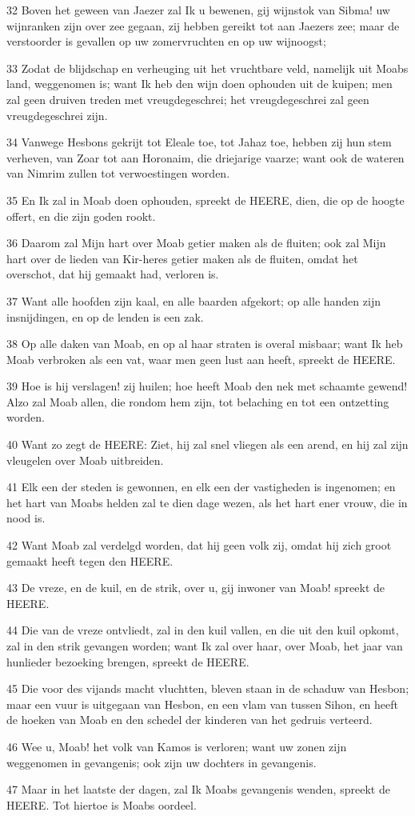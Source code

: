 \par 32 Boven het geween van Jaezer zal Ik u bewenen, gij wijnstok van Sibma! uw wijnranken zijn over zee gegaan, zij hebben gereikt tot aan Jaezers zee; maar de verstoorder is gevallen op uw zomervruchten en op uw wijnoogst;
\par 33 Zodat de blijdschap en verheuging uit het vruchtbare veld, namelijk uit Moabs land, weggenomen is; want Ik heb den wijn doen ophouden uit de kuipen; men zal geen druiven treden met vreugdegeschrei; het vreugdegeschrei zal geen vreugdegeschrei zijn.
\par 34 Vanwege Hesbons gekrijt tot Eleale toe, tot Jahaz toe, hebben zij hun stem verheven, van Zoar tot aan Horonaim, die driejarige vaarze; want ook de wateren van Nimrim zullen tot verwoestingen worden.
\par 35 En Ik zal in Moab doen ophouden, spreekt de HEERE, dien, die op de hoogte offert, en die zijn goden rookt.
\par 36 Daarom zal Mijn hart over Moab getier maken als de fluiten; ook zal Mijn hart over de lieden van Kir-heres getier maken als de fluiten, omdat het overschot, dat hij gemaakt had, verloren is.
\par 37 Want alle hoofden zijn kaal, en alle baarden afgekort; op alle handen zijn insnijdingen, en op de lenden is een zak.
\par 38 Op alle daken van Moab, en op al haar straten is overal misbaar; want Ik heb Moab verbroken als een vat, waar men geen lust aan heeft, spreekt de HEERE.
\par 39 Hoe is hij verslagen! zij huilen; hoe heeft Moab den nek met schaamte gewend! Alzo zal Moab allen, die rondom hem zijn, tot belaching en tot een ontzetting worden.
\par 40 Want zo zegt de HEERE: Ziet, hij zal snel vliegen als een arend, en hij zal zijn vleugelen over Moab uitbreiden.
\par 41 Elk een der steden is gewonnen, en elk een der vastigheden is ingenomen; en het hart van Moabs helden zal te dien dage wezen, als het hart ener vrouw, die in nood is.
\par 42 Want Moab zal verdelgd worden, dat hij geen volk zij, omdat hij zich groot gemaakt heeft tegen den HEERE.
\par 43 De vreze, en de kuil, en de strik, over u, gij inwoner van Moab! spreekt de HEERE.
\par 44 Die van de vreze ontvliedt, zal in den kuil vallen, en die uit den kuil opkomt, zal in den strik gevangen worden; want Ik zal over haar, over Moab, het jaar van hunlieder bezoeking brengen, spreekt de HEERE.
\par 45 Die voor des vijands macht vluchtten, bleven staan in de schaduw van Hesbon; maar een vuur is uitgegaan van Hesbon, en een vlam van tussen Sihon, en heeft de hoeken van Moab en den schedel der kinderen van het gedruis verteerd.
\par 46 Wee u, Moab! het volk van Kamos is verloren; want uw zonen zijn weggenomen in gevangenis; ook zijn uw dochters in gevangenis.
\par 47 Maar in het laatste der dagen, zal Ik Moabs gevangenis wenden, spreekt de HEERE. Tot hiertoe is Moabs oordeel.

